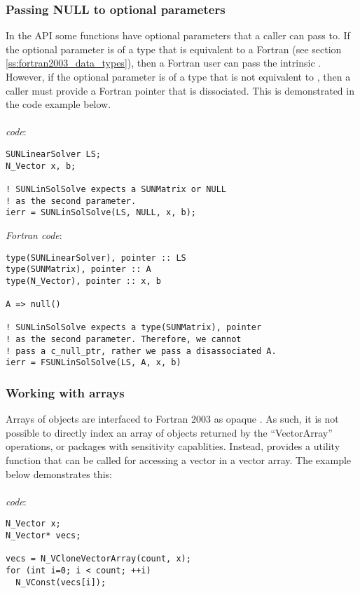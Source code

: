 \subsubsection{Passing NULL to optional parameters}

In the {\sundials} {\CC} API some functions have optional parameters that a
caller can pass  to. If the optional parameter is of a type that is
equivalent to a Fortran  (see section \ref{ss:fortran2003_data_types}),
then a Fortran user can pass the intrinsic . However, if the
optional parameter is of a type that is not equivalent to ,
then a caller must provide a Fortran pointer that is dissociated. This
is demonstrated in the code example below.
\\
\\
\noindent \emph{{\CC} code}:
\begin{verbatim}
SUNLinearSolver LS;
N_Vector x, b;

! SUNLinSolSolve expects a SUNMatrix or NULL
! as the second parameter.
ierr = SUNLinSolSolve(LS, NULL, x, b);
\end{verbatim}

\noindent \emph{Fortran code}:
\begin{verbatim}
type(SUNLinearSolver), pointer :: LS
type(SUNMatrix), pointer :: A
type(N_Vector), pointer :: x, b

A => null()

! SUNLinSolSolve expects a type(SUNMatrix), pointer
! as the second parameter. Therefore, we cannot
! pass a c_null_ptr, rather we pass a disassociated A.
ierr = FSUNLinSolSolve(LS, A, x, b)
\end{verbatim}

\subsubsection{Working with  arrays}
\label{sss:fortran2003_nvarrays}

Arrays of  objects are interfaced to Fortran 2003 as opaque
.  As such, it is not possible to directly index an array of
 objects returned by the  ``VectorArray''
operations, or packages with sensitivity capablities.  Instead, {\sundials}
provides a utility function  that can be called for
accessing a vector in a vector array. The example below demonstrates this:
\\
\\
\noindent \emph{{\CC} code}:
\begin{verbatim}
N_Vector x;
N_Vector* vecs;

vecs = N_VCloneVectorArray(count, x);
for (int i=0; i < count; ++i)
  N_VConst(vecs[i]);
\end{verbatim}

